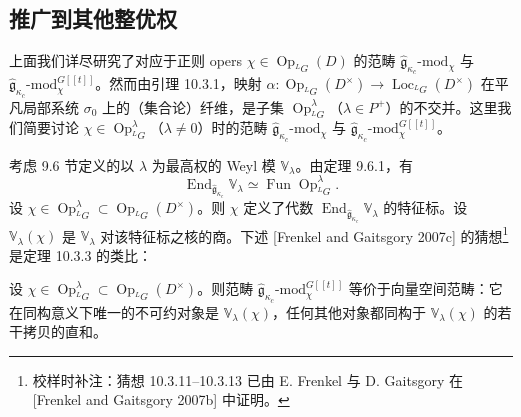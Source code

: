 \subsection{推广到其他整优权}

上面我们详尽研究了对应于正则 opers $\chi\in\operatorname{Op}_{{}^LG}(D)$ 的范畴 $\hat{\mathfrak{g}}_{\kappa_c}\text{-mod}_\chi$ 与 $\hat{\mathfrak{g}}_{\kappa_c}\text{-mod}^{G[[t]]}_\chi$。然而由引理 10.3.1，映射 $\alpha:\operatorname{Op}_{{}^LG}(D^\times)\to\operatorname{Loc}_{{}^LG}(D^\times)$ 在平凡局部系统 $\sigma_0$ 上的（集合论）纤维，是子集 $\operatorname{Op}^\lambda_{{}^LG}$（$\lambda\in P^+$）的不交并。这里我们简要讨论 $\chi\in\operatorname{Op}^\lambda_{{}^LG}$（$\lambda\neq0$）时的范畴 $\hat{\mathfrak{g}}_{\kappa_c}\text{-mod}_\chi$ 与 $\hat{\mathfrak{g}}_{\kappa_c}\text{-mod}^{G[[t]]}_\chi$。

考虑 9.6 节定义的以 $\lambda$ 为最高权的 Weyl 模 $\mathbb{V}_\lambda$。由定理 9.6.1，有
\begin{equation}
    \operatorname{End}_{\hat{\mathfrak{g}}_{\kappa_c}}\mathbb{V}_\lambda
    \simeq\operatorname{Fun}\operatorname{Op}^\lambda_{{}^LG}.
    \tag{10.3-28}
\end{equation}
设 $\chi\in\operatorname{Op}^\lambda_{{}^LG}\subset\operatorname{Op}_{{}^LG}(D^\times)$。则 $\chi$ 定义了代数 $\operatorname{End}_{\hat{\mathfrak{g}}_{\kappa_c}}\mathbb{V}_\lambda$ 的特征标。设 $\mathbb{V}_\lambda(\chi)$ 是 $\mathbb{V}_\lambda$ 对该特征标之核的商。下述 [Frenkel and Gaitsgory 2007c] 的猜想\footnote{校样时补注：猜想 10.3.11–10.3.13 已由 E. Frenkel 与 D. Gaitsgory 在 [Frenkel and Gaitsgory 2007b] 中证明。}是定理 10.3.3 的类比：

\begin{conjecture}
    设 $\chi\in\operatorname{Op}^\lambda_{{}^LG}\subset\operatorname{Op}_{{}^LG}(D^\times)$。则范畴 $\hat{\mathfrak{g}}_{\kappa_c}\text{-mod}^{G[[t]]}_\chi$ 等价于向量空间范畴：它在同构意义下唯一的不可约对象是 $\mathbb{V}_\lambda(\chi)$，任何其他对象都同构于 $\mathbb{V}_\lambda(\chi)$ 的若干拷贝的直和。
\end{conjecture}

